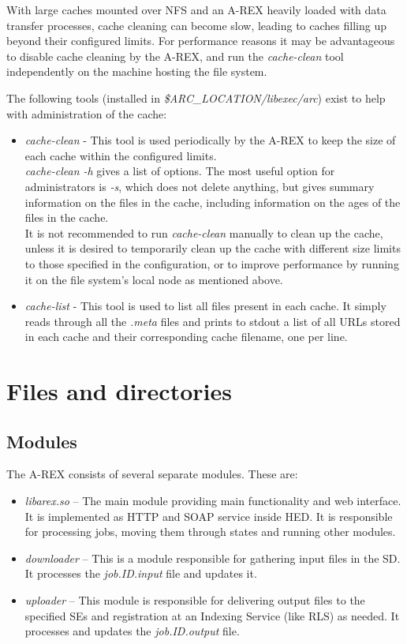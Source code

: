 \documentclass{article}                            %
\begin{document}
With large caches mounted over NFS and an A-REX heavily loaded with
data transfer processes, cache cleaning can become slow, leading to
caches filling up beyond their configured limits. For performance
reasons it may be advantageous to disable cache cleaning by the A-REX,
and run the \emph{cache-clean} tool independently on the machine
hosting the file system.

The following tools (installed in \emph{\$ARC\_LOCATION/libexec/arc})
exist to help with administration of the cache:

\begin{itemize}
\item \emph{cache-clean} - This tool is used periodically by the A-REX to
  keep the size of each cache within the configured
  limits.\\
  \emph{cache-clean -h} gives a list of options. The most
  useful option for administrators is \emph{-s}, which does not delete
  anything, but gives summary information on the files in the cache,
  including information on the ages of the files in the cache.\\
  It is not recommended to run \emph{cache-clean} manually to clean up
  the cache, unless it is desired to temporarily clean up the cache with
  different size limits to those specified in the configuration, or to
  improve performance by running it on the file system's local node as
  mentioned above.
\item \emph{cache-list} - This tool is used to list all files present
  in each cache. It simply reads through all the \emph{.meta }files
  and prints to stdout a list of all URLs stored in each cache and
  their corresponding cache filename, one per line.
\end{itemize}


\section{Files and directories\label{sec:files and directories}}

\subsection{Modules}

The A-REX consists of several separate modules. These are:

\begin{itemize}
\item \textit{libarex.so} -- The main module providing main functionality
and web interface. It is implemented as HTTP and SOAP service inside
HED. It is responsible for processing jobs, moving them through states
and running other modules.
\item \textit{downloader} -- This is a module responsible for gathering input
files in the SD. It processes the \textit{job.ID.input} file and updates
it.
\item \textit{uploader} -- This module is responsible for delivering output
files to the specified SEs and registration at an Indexing Service
(like RLS) as needed. It processes and updates the \textit{job.ID.output}
file.
\end{itemize}
\end{document}
